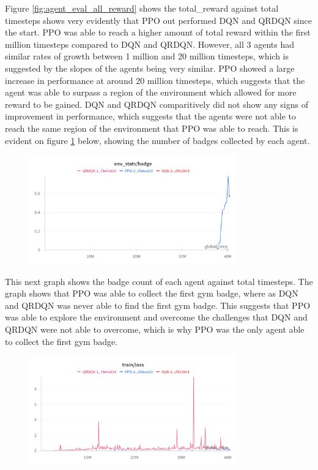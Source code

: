 Figure \ref{fig:agent_eval_all_reward} shows the total\_reward against total timesteps shows very evidently that PPO out performed DQN and QRDQN since the start. PPO was able to reach a higher amount of total reward within the first million timesteps compared to DQN and QRDQN. However, all 3 agents had similar rates of growth between 1 million and 20 million timesteps, which is suggested by the slopes of the agents being very similar. PPO showed a large increase in performance at around 20 million timesteps, which suggests that the agent was able to surpass a region of the environment which allowed for more reward to be gained. DQN and QRDQN comparitively did not show any signs of improvement in performance, which suggests that the agents were not able to reach the same region of the environment that PPO was able to reach. This is evident on figure \ref{fig:agent_eval_all_badge} below, showing the number of badges collected by each agent.

\begin{figure}[H]
    \centering
    \includegraphics[width=0.8\textwidth]{figures/all_step_badge.png}
    \caption{}
    \label{fig:agent_eval_all_badge}
\end{figure}

This next graph shows the badge count of each agent against total timesteps. The graph shows that PPO was able to collect the first gym badge, where as DQN and QRDQN was never able to find the first gym badge. This suggests that PPO was able to explore the environment and overcome the challenges that DQN and QRDQN were not able to overcome, which is why PPO was the only agent able to collect the first gym badge. 

\begin{figure}[H]
    \centering
    \includegraphics[width=0.8\textwidth]{figures/all_step_loss.png}
    \caption{}
    \label{fig:agent_eval_all_loss}
\end{figure}

